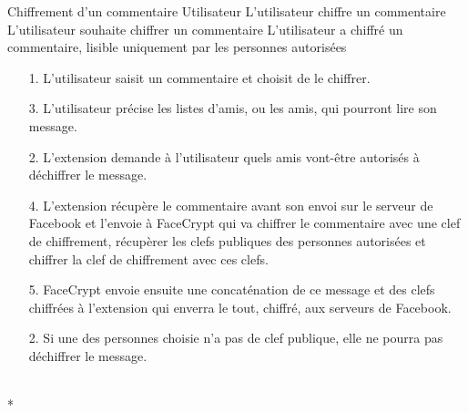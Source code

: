 \documentclass[a4paper,11pt,french]{article}
\begin{document}
\fiche
	{Chiffrement d'un commentaire}
	{Utilisateur}
	{L'utilisateur chiffre un commentaire}
	{}
	{L'utilisateur souhaite chiffrer un commentaire}
	{L'utilisateur a chiffré un commentaire, lisible uniquement par les 
	personnes autorisées}
	{\begin{itemize}
	    \item[]
	  \item[1.] L'utilisateur saisit un commentaire et choisit de le chiffrer.
      \item[3.] L'utilisateur précise les listes d'amis, ou les amis, 
          qui pourront lire son message.
	\end{itemize}
	}
	{\begin{itemize}
        \item[]
        \item[2.] L'extension demande à l'utilisateur quels amis vont-être
            autorisés à déchiffrer le message.
		\item[4.] L'extension récupère le commentaire avant son envoi sur le 
            serveur de Facebook et l'envoie à FaceCrypt qui va chiffrer le 
            commentaire avec une clef de chiffrement, récupèrer les clefs 
            publiques des personnes autorisées et chiffrer la clef de chiffrement
        avec ces clefs.
		\item[5.] FaceCrypt envoie ensuite une concaténation de 
        ce message et des clefs chiffrées à l'extension qui enverra le tout,
        chiffré, aux serveurs de Facebook.
	\end{itemize}
	}
	{}
\flots
    {\begin{itemize}
    \item[]
    \item[2.] Si une des personnes choisie n'a pas de clef publique,
        elle ne pourra pas déchiffrer le message.
    \end{itemize}
    }
	{}    
\\*
\end{document}
